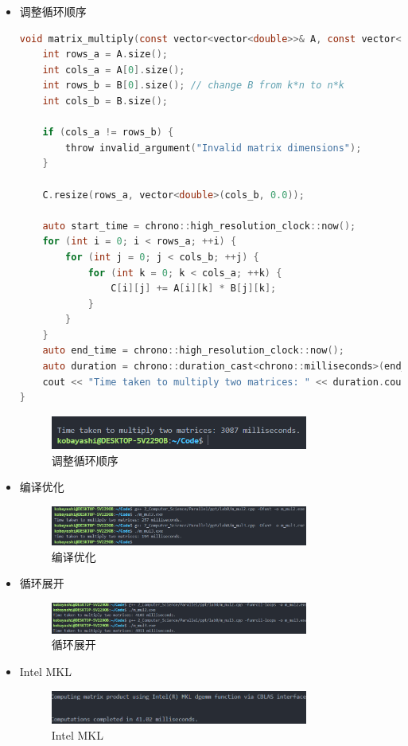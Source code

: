 \documentclass{SYSUReport}
\begin{document}
\begin{itemize}
    \item 调整循环顺序
\begin{lstlisting}[language=C]
void matrix_multiply(const vector<vector<double>>& A, const vector<vector<double>>& B, vector<vector<double>>& C) {
    int rows_a = A.size();
    int cols_a = A[0].size();
    int rows_b = B[0].size(); // change B from k*n to n*k
    int cols_b = B.size();

    if (cols_a != rows_b) {
        throw invalid_argument("Invalid matrix dimensions");
    }

    C.resize(rows_a, vector<double>(cols_b, 0.0));

    auto start_time = chrono::high_resolution_clock::now();
    for (int i = 0; i < rows_a; ++i) {
        for (int j = 0; j < cols_b; ++j) {
            for (int k = 0; k < cols_a; ++k) {
                C[i][j] += A[i][k] * B[j][k];
            }
        }
    }
    auto end_time = chrono::high_resolution_clock::now();
    auto duration = chrono::duration_cast<chrono::milliseconds>(end_time - start_time);
    cout << "Time taken to multiply two matrices: " << duration.count() << " milliseconds." << endl;
}
\end{lstlisting}
\begin{figure}[H]
    \centering
    \includegraphics[width=0.8\textwidth]{figures/m_mul3.png}
    \caption{调整循环顺序}
\end{figure}

    \item 编译优化
\begin{figure}[H]
    \centering
    \includegraphics[width=0.8\textwidth]{figures/m_mul4.png}
    \caption{编译优化}
\end{figure}

    \item 循环展开
\begin{figure}[H]
    \centering
    \includegraphics[width=0.8\textwidth]{figures/m_mul5.png}
    \caption{循环展开}
\end{figure}

    \item Intel MKL
\begin{figure}[H]
    \centering
    \includegraphics[width=0.8\textwidth]{figures/m_mul6.png}
    \caption{Intel MKL}
\end{figure}

\end{itemize}
\end{document}
